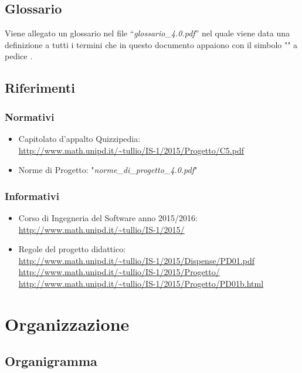 \documentclass[a4paper,11pt]{article}
\begin{document}
	\subsection{Glossario}
	Viene allegato un glossario nel file ``\textit{glossario\_4.0.pdf}'' nel quale viene data una definizione a tutti i termini che in questo documento appaiono con il simbolo "\addglos" a pedice .
	\subsection{Riferimenti}
		\subsubsection{Normativi}
		\begin{itemize}
			\item Capitolato d'appalto Quizzipedia:\\
			\url{http://www.math.unipd.it/~tullio/IS-1/2015/Progetto/C5.pdf}
			\item Norme di Progetto: "\textit{norme\_di\_progetto\_4.0.pdf}"
		\end{itemize}
		\subsubsection{Informativi}
		\begin{itemize}
			\item Corso di Ingegneria del Software anno 2015/2016:\\
			\url{http://www.math.unipd.it/~tullio/IS-1/2015/}
			\item Regole del progetto didattico:\\
			\url{http://www.math.unipd.it/~tullio/IS-1/2015/Dispense/PD01.pdf}
			\url{http://www.math.unipd.it/~tullio/IS-1/2015/Progetto/}\\
			\url{http://www.math.unipd.it/~tullio/IS-1/2015/Progetto/PD01b.html}
		\end{itemize}
	\pagebreak
	
	\newpage
	\section{Organizzazione}	
	\subsection{Organigramma}
\end{document}
